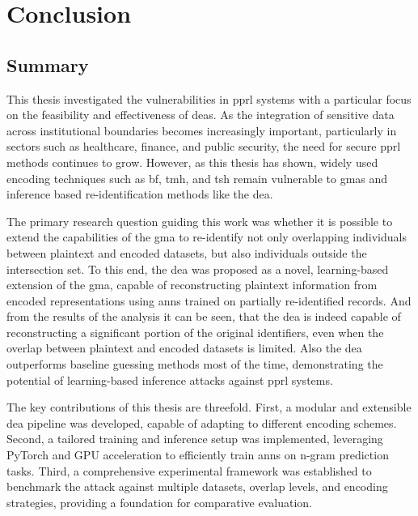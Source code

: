 \chapter{Conclusion}  \label{sec:conclusion}

\section{Summary}   \label{sec:summary}

This thesis investigated the vulnerabilities in \ac{pprl} systems with a particular focus on the feasibility and effectiveness of \ac{dea}s.
As the integration of sensitive data across institutional boundaries becomes increasingly important, particularly in sectors such as healthcare, finance, and public security, the need for secure \ac{pprl} methods continues to grow.
However, as this thesis has shown, widely used encoding techniques such as \ac{bf}, \ac{tmh}, and \ac{tsh} remain vulnerable to \ac{gma}s and inference based re-identification methods like the \ac{dea}.

The primary research question guiding this work was whether it is possible to extend the capabilities of the \ac{gma} to re-identify not only overlapping individuals between plaintext and encoded datasets, but also individuals outside the intersection set.
To this end, the \ac{dea} was proposed as a novel, learning-based extension of the \ac{gma}, capable of reconstructing plaintext information from encoded representations using \ac{ann}s trained on partially re-identified records.
And from the results of the analysis it can be seen, that the \ac{dea} is indeed capable of reconstructing a significant portion of the original identifiers, even when the overlap between plaintext and encoded datasets is limited.
Also the \ac{dea} outperforms baseline guessing methods most of the time, demonstrating the potential of learning-based inference attacks against \ac{pprl} systems.

The key contributions of this thesis are threefold.
First, a modular and extensible \ac{dea} pipeline was developed, capable of adapting to different encoding schemes.
Second, a tailored training and inference setup was implemented, leveraging PyTorch and GPU acceleration to efficiently train \ac{ann}s on n-gram prediction tasks.
Third, a comprehensive experimental framework was established to benchmark the attack against multiple datasets, overlap levels, and encoding strategies, providing a foundation for comparative evaluation.

